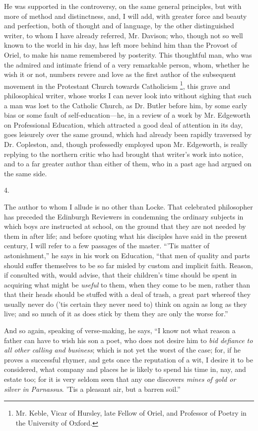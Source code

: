 He was supported in the controversy, on the same general
principles, but with more of method and distinctness, and, I
will add, with greater force and beauty and perfection, both of
thought and of language, by the other distinguished writer, to whom I
have already referred, Mr. Davison; who, though not so well known to
the world in his day, has left more behind him than the Provost of
Oriel, to make his name remembered by posterity. This thoughtful man,
who was the admired and intimate friend of a very remarkable person,
whom, whether he wish it or not, numbers revere and love as the first
author of the subsequent movement in the Protestant Church towards
Catholicism \footnote{Mr. Keble, Vicar of Hursley, late Fellow of Oriel, and Professor
of Poetry in the University of Oxford.}, this
grave and philosophical writer, whose works I can never look into
without sighing that such a man was lost to the Catholic Church, as
Dr. Butler before him, by some early bias or some fault of
self-education—he, in a review of a work by Mr. Edgeworth on
Professional Education, which attracted a good deal of attention in
its day, goes leisurely over the same ground, which had already been
rapidly traversed by Dr. Copleston, and, though professedly employed
upon Mr. Edgeworth, is really replying to the northern critic who had
brought that writer's work into notice, and to a far greater author
than either of them, who in a past age had argued on the same side.

4.

The author to whom I allude is no other than Locke. That celebrated
philosopher has preceded the Edinburgh Reviewers in condemning the
ordinary subjects in which boys are instructed at school, on the
ground that they are not needed by them in after life; and before
quoting what his disciples have said in the present century, I will
refer to a few passages of the master. ``'Tis matter of
astonishment,'' he says in his work on Education, ``that men
of quality and parts should suffer themselves to be so far misled by
custom and implicit faith. Reason, if consulted with, would advise,
that their children's time should be spent in acquiring what might be \emph{useful}
to them, when they come to be men, rather than that their heads should
be stuffed with a deal of trash, a great part whereof they usually
never do ('tis certain they never need to) think on again as long as
they live; and so much of it as does stick by them they are only the
worse for.''

And so again, speaking of verse-making, he says, ``I know not
what reason a father can have to wish his son a poet, who does not
desire him to \emph{bid defiance to all other calling and business};
which is not yet the worst of the case; for, if he proves a successful
rhymer, and gets once the reputation of a wit, I desire it to be
considered, what company and places he is likely to spend his time in,
nay, and estate too; for it is very seldom seen that any one discovers
\emph{mines of gold or silver in Parnassus}. 'Tis a pleasant air, but
a barren soil.''

